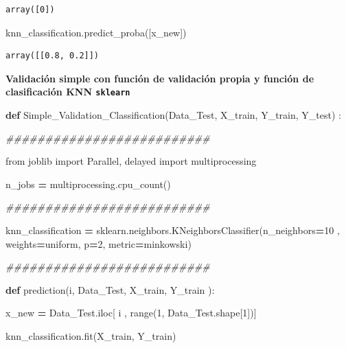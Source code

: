 \documentclass[
  11pt,
  a4paper,
]{article}
\newenvironment{Shaded}{\begin{snugshade}}{\end{snugshade}}
\newcommand{\BuiltInTok}[1]{#1}
\newcommand{\CommentTok}[1]{\textcolor[rgb]{0.56,0.35,0.01}{\textit{#1}}}
\newcommand{\DecValTok}[1]{\textcolor[rgb]{0.00,0.00,0.81}{#1}}
\newcommand{\ImportTok}[1]{#1}
\newcommand{\KeywordTok}[1]{\textcolor[rgb]{0.13,0.29,0.53}{\textbf{#1}}}
\newcommand{\NormalTok}[1]{#1}
\newcommand{\OperatorTok}[1]{\textcolor[rgb]{0.81,0.36,0.00}{\textbf{#1}}}
\newcommand{\StringTok}[1]{\textcolor[rgb]{0.31,0.60,0.02}{#1}}
\begin{document}
\begin{verbatim}
array([0])
\end{verbatim}

\begin{Shaded}
\begin{Highlighting}[]
\NormalTok{knn\_classification.predict\_proba([x\_new])}
\end{Highlighting}
\end{Shaded}

\begin{verbatim}
array([[0.8, 0.2]])
\end{verbatim}

\newpage

\textbf{Validación simple con función de validación propia y función de
clasificación KNN \texttt{sklearn}}

\begin{Shaded}
\begin{Highlighting}[]
\KeywordTok{def}\NormalTok{ Simple\_Validation\_Classification(Data\_Test, X\_train, Y\_train, Y\_test) :}

    \CommentTok{\#\#\#\#\#\#\#\#\#\#\#\#\#\#\#\#\#\#\#\#\#\#\#\#\#\#}

    \ImportTok{from}\NormalTok{ joblib }\ImportTok{import}\NormalTok{ Parallel, delayed}
    \ImportTok{import}\NormalTok{ multiprocessing}

\NormalTok{    n\_jobs  }\OperatorTok{=}\NormalTok{ multiprocessing.cpu\_count()}

    \CommentTok{\#\#\#\#\#\#\#\#\#\#\#\#\#\#\#\#\#\#\#\#\#\#\#\#\#\#}

\NormalTok{    knn\_classification }\OperatorTok{=}\NormalTok{ sklearn.neighbors.KNeighborsClassifier(n\_neighbors}\OperatorTok{=}\DecValTok{10}\NormalTok{ ,  weights}\OperatorTok{=}\StringTok{\textquotesingle{}uniform\textquotesingle{}}\NormalTok{, p}\OperatorTok{=}\DecValTok{2}\NormalTok{, metric}\OperatorTok{=}\StringTok{\textquotesingle{}minkowski\textquotesingle{}}\NormalTok{)}

    \CommentTok{\#\#\#\#\#\#\#\#\#\#\#\#\#\#\#\#\#\#\#\#\#\#\#\#\#\#}

    \KeywordTok{def}\NormalTok{ prediction(i, Data\_Test, X\_train, Y\_train ):}

\NormalTok{     x\_new }\OperatorTok{=}\NormalTok{ Data\_Test.iloc[ i , }\BuiltInTok{range}\NormalTok{(}\DecValTok{1}\NormalTok{, Data\_Test.shape[}\DecValTok{1}\NormalTok{])]}

\NormalTok{     knn\_classification.fit(X\_train, Y\_train)}
     

\end{Highlighting}
\end{Shaded}
\end{document}
